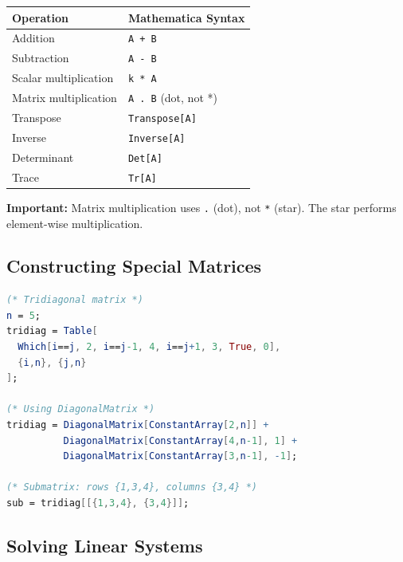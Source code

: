 \documentclass[12pt,a4paper]{article}
\begin{document}
\begin{definitionbox}
    \begin{tabular}{|p{3cm}|p{10cm}|}
        \hline
        \textbf{Operation} & \textbf{Mathematica Syntax} \\
        \hline
        Addition & \texttt{A + B} \\
        Subtraction & \texttt{A - B} \\
        Scalar multiplication & \texttt{k * A} \\
        Matrix multiplication & \texttt{A . B} (dot, not *) \\
        Transpose & \texttt{Transpose[A]} \\
        Inverse & \texttt{Inverse[A]} \\
        Determinant & \texttt{Det[A]} \\
        Trace & \texttt{Tr[A]} \\
        \hline
    \end{tabular}
\end{definitionbox}

\begin{tipbox}
    \textbf{Important:} Matrix multiplication uses \texttt{.} (dot), not \texttt{*} (star). 
    The star performs element-wise multiplication.
\end{tipbox}

\subsection{Constructing Special Matrices}

\begin{mathematicabox}
    \begin{lstlisting}[language=Mathematica, basicstyle=\ttfamily\small]
(* Tridiagonal matrix *)
n = 5;
tridiag = Table[
  Which[i==j, 2, i==j-1, 4, i==j+1, 3, True, 0],
  {i,n}, {j,n}
];

(* Using DiagonalMatrix *)
tridiag = DiagonalMatrix[ConstantArray[2,n]] + 
          DiagonalMatrix[ConstantArray[4,n-1], 1] + 
          DiagonalMatrix[ConstantArray[3,n-1], -1];

(* Submatrix: rows {1,3,4}, columns {3,4} *)
sub = tridiag[[{1,3,4}, {3,4}]];
    \end{lstlisting}
\end{mathematicabox}

\subsection{Solving Linear Systems}
\end{document}
